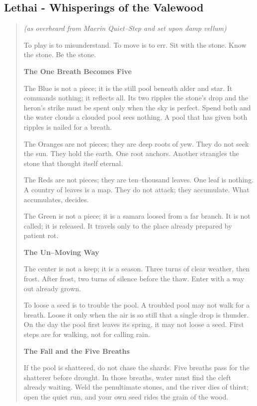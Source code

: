 \documentclass[11pt]{article}
\begin{document}
\subsection{Lethai - Whisperings of the Valewood}
\begin{quote}\small\itshape
(as overheard from Maerin Quiet--Step and set upon damp vellum)

To play is to misunderstand. To move is to err. Sit with the stone. Know the stone. Be the stone.

\medskip
\textbf{The One Breath Becomes Five}

The Blue is not a piece; it is the still pool beneath alder and star. It commands nothing; it reflects all. Its two ripples\; the stone’s drop and the heron’s strike\; must be spent only when the sky is perfect. Spend both and the water clouds\; a clouded pool sees nothing. A pool that has given both ripples is nailed for a breath.

The Oranges are not pieces; they are deep roots of yew. They do not seek the sun. They hold the earth. One root anchors. Another strangles the stone that thought itself eternal.

The Reds are not pieces; they are ten--thousand leaves. One leaf is nothing. A country of leaves is a map. They do not attack; they accumulate. What accumulates, decides.

The Green is not a piece; it is a samara loosed from a far branch. It is not called; it is released. It travels only to the place already prepared by patient rot.

\medskip
\textbf{The Un--Moving Way}

The center is not a keep; it is a season. Three turns of clear weather, then frost. After frost, two turns of silence before the thaw. Enter with a way out already grown.

To loose a seed is to trouble the pool. A troubled pool may not walk for a breath. Loose it only when the air is so still that a single drop is thunder. On the day the pool first leaves its spring, it may not loose a seed. First steps are for walking, not for calling rain.

\medskip
\textbf{The Fall and the Five Breaths}

If the pool is shattered, do not chase the shards. Five breaths pass for the shatterer before drought. In those breaths, water must find the cleft already waiting. Weld the penultimate stones, and the river dies of thirst; open the quiet run, and your own seed rides the grain of the wood.


\end{quote}
\end{document}
